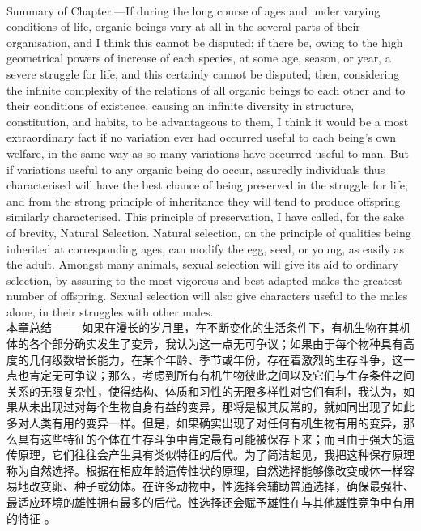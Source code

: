 \documentclass{article}
\begin{document}
\\
Summary of Chapter.—If during the long course of ages and under varying conditions of life, organic beings vary at all in the several parts of their organisation, and I think this cannot be disputed; if there be, owing to the high geometrical powers of increase of each species, at some age, season, or year, a severe struggle for life, and this certainly cannot be disputed; then, considering the infinite complexity of the relations of all organic beings to each other and to their conditions of existence, causing an infinite diversity in structure, constitution, and habits, to be advantageous to them, I think it would be a most extraordinary fact if no variation ever had occurred useful to each being’s own welfare, in the same way as so many variations have occurred useful to man. But if variations useful to any organic being do occur, assuredly individuals thus characterised will have the best chance of being preserved in the struggle for life; and from the strong principle of inheritance they will tend to produce offspring similarly characterised. This principle of preservation, I have called, for the sake of brevity, Natural Selection. Natural selection, on the principle of qualities being inherited at corresponding ages, can modify the egg, seed, or young, as easily as the adult. Amongst many animals, sexual selection will give its aid to ordinary selection, by assuring to the most vigorous and best adapted males the greatest number of offspring. Sexual selection will also give characters useful to the males alone, in their struggles with other males.\\
本章总结 —— 如果在漫长的岁月里，在不断变化的生活条件下，有机生物在其机体的各个部分确实发生了变异，我认为这一点无可争议；如果由于每个物种具有高度的几何级数增长能力，在某个年龄、季节或年份，存在着激烈的生存斗争，这一点也肯定无可争议；那么，考虑到所有有机生物彼此之间以及它们与生存条件之间关系的无限复杂性，使得结构、体质和习性的无限多样性对它们有利，我认为，如果从未出现过对每个生物自身有益的变异，那将是极其反常的，就如同出现了如此多对人类有用的变异一样。但是，如果确实出现了对任何有机生物有用的变异，那么具有这些特征的个体在生存斗争中肯定最有可能被保存下来；而且由于强大的遗传原理，它们往往会产生具有类似特征的后代。为了简洁起见，我把这种保存原理称为自然选择。根据在相应年龄遗传性状的原理，自然选择能够像改变成体一样容易地改变卵、种子或幼体。在许多动物中，性选择会辅助普通选择，确保最强壮、最适应环境的雄性拥有最多的后代。性选择还会赋予雄性在与其他雄性竞争中有用的特征 。 
\end{document}
